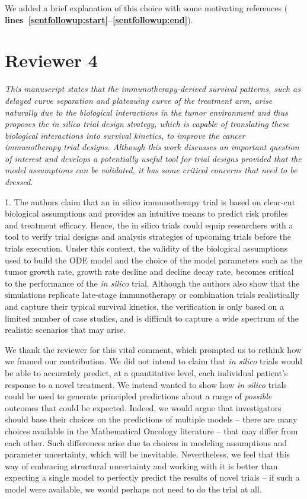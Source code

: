 \documentclass{article}
\newcommand{\revr}[1]{{\color{gray} \itshape #1}}
\newcommand{\auth}[1]{{#1}}
\newcommand{\chng}[1]{{\color{blue!70!black} #1}}
\newcommand{\lr}[1]{{\bfseries\color{red!70!black} lines~\ref{#1:start}--\ref{#1:end}}}
\begin{document}
\chng{We added a brief explanation of this choice with some motivating references (\lr{sentfollowup}).}

\section*{Reviewer 4}

\revr{This manuscript states that the immunotherapy-derived survival patterns, such as delayed curve separation and plateauing curve of the treatment arm, arise naturally due to the biological interactions in the tumor environment and thus proposes the in silico trial design strategy, which is capable of translating these biological interactions into survival kinetics, to improve the cancer immunotherapy trial designs. Although this work discusses an important question of interest and develops a potentially useful tool for trial designs provided that the model assumptions can be validated, it has some critical concerns that need to be dressed.

1. The authors claim that an in silico immunotherapy trial is based on clear-cut biological
assumptions and provides an intuitive means to predict risk profiles and treatment efficacy. Hence, the in silico trials could equip researchers with a tool to verify trial designs and analysis strategies of upcoming trials before the trials execution. Under this context, the validity of the biological assumptions used to build the ODE model and the choice of the model parameters such as the tumor growth rate, growth rate decline and decline decay rate, becomes critical to the performance of the \emph{in silico} trial. Although the authors also show that the simulations replicate late-stage immunotherapy or combination trials realistically and capture their typical survival kinetics, the verification is only based on a limited number of case studies, and is difficult to capture a wide spectrum of the realistic scenarios that may arise.}

\auth{We thank the reviewer for this vital comment, which prompted us to rethink how we framed our contribution. We did not intend to claim that \emph{in silico} trials would be able to accurately predict, at a quantitative level, each individual patient's response to a novel treatment. We instead wanted to show how \emph{in silico} trials could be used to generate principled predictions about a range of \emph{possible} outcomes that could be expected. Indeed, we would argue that investigators should base their choices on the predictions of multiple models -- there are many choices available in the Mathematical Oncology literature -- that may differ from each other. Such differences arise due to choices in modeling assumptions and parameter uncertainty, which will be inevitable. Nevertheless, we feel that this way of embracing structural uncertainty and working with it is better than expecting a single model to perfectly predict the results of novel trials -- if such a model were available, we would perhaps not need to do the trial at all.}
\end{document}
